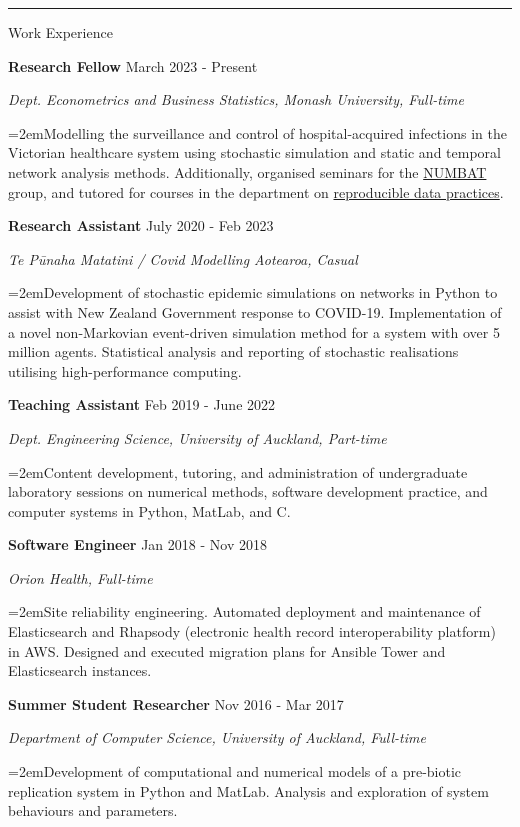 \documentclass[paper=a4paper,fontsize=11pt]{scrartcl}
\newcommand{\pagerule}[1][2pt]{\noindent\rule{\textwidth}{#1}}
\newcommand{\usingfont}[2]{#1 #2 \par \normalsize \normalfont}
\newcommand{\sectionheader}[1]{\pagerule \vspace{0.05ex} \usingfont{\usefont{T1}{phv}{m}{v} \Large}{\noindent \hspace{-0.5em} #1} \vspace{0.75ex}}
\newcommand{\indented}[1][2em]{\noindent\hangindent=#1\hangafter=0}
\begin{document}
\sectionheader{Work Experience}
\noindent \textbf{Research Fellow} \hfill
{March 2023 - Present} \par
\noindent \textit{Dept. Econometrics and Business Statistics, Monash
University, Full-time} \par
\indented \small {Modelling the surveillance and control of
hospital-acquired infections in the Victorian healthcare system using
stochastic simulation and static and temporal network analysis methods.
Additionally, organised seminars for the
\href{https://numbat.space}{NUMBAT} group, and tutored for courses in
the department on
\href{https://handbook.monash.edu/2024/units/ETC5513}{reproducible data
practices}.}
\normalsize \par\par
\noindent \textbf{Research Assistant} \hfill
{July 2020 - Feb 2023} \par
\noindent \textit{Te Pūnaha Matatini / Covid Modelling
Aotearoa, Casual} \par
\indented \small {Development of stochastic epidemic simulations on
networks in Python to assist with New Zealand Government response to
COVID-19. Implementation of a novel non-Markovian event-driven
simulation method for a system with over 5 million agents. Statistical
analysis and reporting of stochastic realisations utilising
high-performance computing.}
\normalsize \par\par
\noindent \textbf{Teaching Assistant} \hfill
{Feb 2019 - June 2022} \par
\noindent \textit{Dept. Engineering Science, University of
Auckland, Part-time} \par
\indented \small {Content development, tutoring, and administration of
undergraduate laboratory sessions on numerical methods, software
development practice, and computer systems in Python, MatLab, and C.}
\normalsize \par\par
\noindent \textbf{Software Engineer} \hfill
{Jan 2018 - Nov 2018} \par
\noindent \textit{Orion Health, Full-time} \par
\indented \small {Site reliability engineering. Automated deployment and
maintenance of Elasticsearch and Rhapsody (electronic health record
interoperability platform) in AWS. Designed and executed migration plans
for Ansible Tower and Elasticsearch instances.}
\normalsize \par\par
\noindent \textbf{Summer Student Researcher} \hfill
{Nov 2016 - Mar 2017} \par
\noindent \textit{Department of Computer Science, University of
Auckland, Full-time} \par
\indented \small {Development of computational and numerical models of a
pre-biotic replication system in Python and MatLab. Analysis and
exploration of system behaviours and parameters.}
\normalsize \par\par
\end{document}
